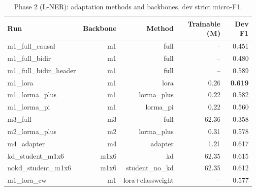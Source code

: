 \begin{table}[t]
\centering\small
\begin{tabular}{lrrrr}
\toprule
Run & Backbone & Method & Trainable (M) & Dev F1 \\
\midrule
m1\_full\_causal & m1 & full & -- & 0.451 \\
m1\_full\_bidir & m1 & full & -- & 0.480 \\
m1\_full\_bidir\_header & m1 & full & -- & 0.589 \\
m1\_lora & m1 & lora & 0.26 & \textbf{0.619} \\
m1\_lorma\_plus & m1 & lorma\_plus & 0.22 & 0.582 \\
m1\_lorma\_pi & m1 & lorma\_pi & 0.22 & 0.560 \\
m3\_full & m3 & full & 62.36 & 0.358 \\
m2\_lorma\_plus & m2 & lorma\_plus & 0.31 & 0.578 \\
m4\_adapter & m4 & adapter & 1.21 & 0.617 \\
kd\_student\_m1x6 & m1x6 & kd & 62.35 & 0.615 \\
nokd\_student\_m1x6 & m1x6 & student\_no\_kd & 62.35 & 0.612 \\
m1\_lora\_cw & m1 & lora+classweight & -- & 0.577 \\
\bottomrule
\end{tabular}
\caption{Phase 2 (L-NER): adaptation methods and backbones, dev strict micro-F1.}
\label{tab:p2}
\end{table}
